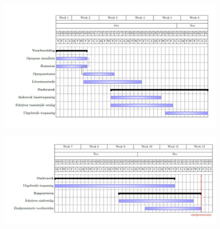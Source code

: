 \documentclass[a4paper,twoside,kulak]{kulakreport}
\begin{document}
\begin{landscape}
	\begin{figure}
		\includegraphics[width= 2\textwidth]{ganttchart_1}
	\end{figure}
	\begin{figure}
		\includegraphics[width= 2\textwidth]{ganttchart_2}
	\end{figure}
\end{landscape}







\end{document}
